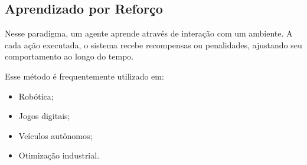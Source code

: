 \subsection{Aprendizado por Reforço}

Nesse paradigma, um agente aprende através de interação com um ambiente. A cada ação
executada, o sistema recebe recompensas ou penalidades, ajustando seu comportamento ao
longo do tempo.

Esse método é frequentemente utilizado em:

\begin{itemize}
    \item Robótica;
    \item Jogos digitais;
    \item Veículos autônomos;
    \item Otimização industrial.
\end{itemize} 